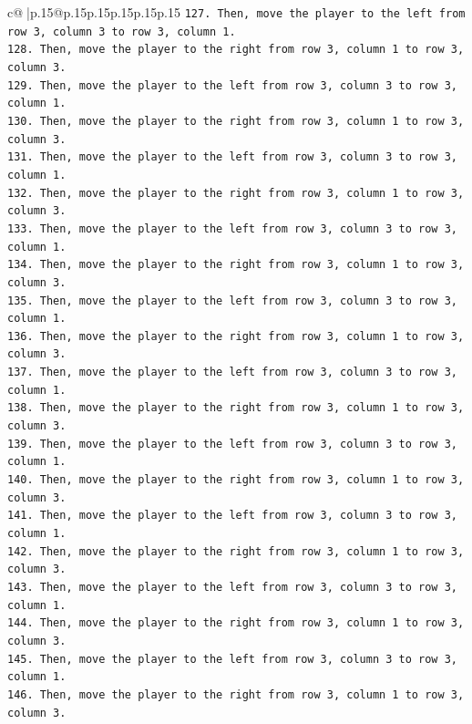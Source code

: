 \documentclass{article}
\begin{document}
{\begin{supertabular}{c@{$\;$}|p{.15\linewidth}@{}p{.15\linewidth}p{.15\linewidth}p{.15\linewidth}p{.15\linewidth}p{.15\linewidth}}
{{{\texttt{127. Then, move the player to the left from row 3, column 3 to row 3, column 1.} \\
\texttt{128. Then, move the player to the right from row 3, column 1 to row 3, column 3.} \\
\texttt{129. Then, move the player to the left from row 3, column 3 to row 3, column 1.} \\
\texttt{130. Then, move the player to the right from row 3, column 1 to row 3, column 3.} \\
\texttt{131. Then, move the player to the left from row 3, column 3 to row 3, column 1.} \\
\texttt{132. Then, move the player to the right from row 3, column 1 to row 3, column 3.} \\
\texttt{133. Then, move the player to the left from row 3, column 3 to row 3, column 1.} \\
\texttt{134. Then, move the player to the right from row 3, column 1 to row 3, column 3.} \\
\texttt{135. Then, move the player to the left from row 3, column 3 to row 3, column 1.} \\
\texttt{136. Then, move the player to the right from row 3, column 1 to row 3, column 3.} \\
\texttt{137. Then, move the player to the left from row 3, column 3 to row 3, column 1.} \\
\texttt{138. Then, move the player to the right from row 3, column 1 to row 3, column 3.} \\
\texttt{139. Then, move the player to the left from row 3, column 3 to row 3, column 1.} \\
\texttt{140. Then, move the player to the right from row 3, column 1 to row 3, column 3.} \\
\texttt{141. Then, move the player to the left from row 3, column 3 to row 3, column 1.} \\
\texttt{142. Then, move the player to the right from row 3, column 1 to row 3, column 3.} \\
\texttt{143. Then, move the player to the left from row 3, column 3 to row 3, column 1.} \\
\texttt{144. Then, move the player to the right from row 3, column 1 to row 3, column 3.} \\
\texttt{145. Then, move the player to the left from row 3, column 3 to row 3, column 1.} \\
\texttt{146. Then, move the player to the right from row 3, column 1 to row 3, column 3.} \\
}}}
\end{supertabular}}
\end{document}
